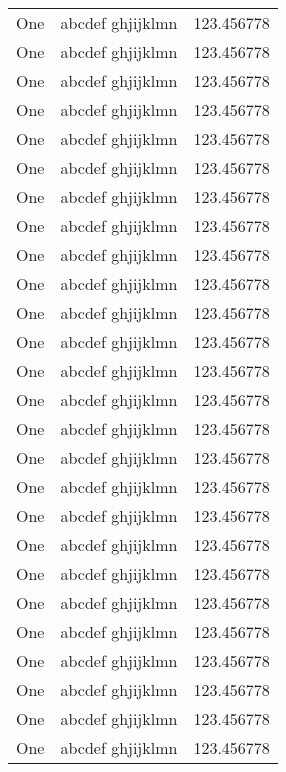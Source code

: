 \begin{longtable}{|p{3cm}|p{7cm}|p{5cm}|}
    One & abcdef ghjijklmn & 123.456778 \\
    One & abcdef ghjijklmn & 123.456778 \\
    One & abcdef ghjijklmn & 123.456778 \\
    One & abcdef ghjijklmn & 123.456778 \\
    One & abcdef ghjijklmn & 123.456778 \\
    One & abcdef ghjijklmn & 123.456778 \\
    One & abcdef ghjijklmn & 123.456778 \\
    One & abcdef ghjijklmn & 123.456778 \\
    One & abcdef ghjijklmn & 123.456778 \\
    One & abcdef ghjijklmn & 123.456778 \\
    One & abcdef ghjijklmn & 123.456778 \\
    One & abcdef ghjijklmn & 123.456778 \\
    One & abcdef ghjijklmn & 123.456778 \\
    One & abcdef ghjijklmn & 123.456778 \\
    One & abcdef ghjijklmn & 123.456778 \\
    One & abcdef ghjijklmn & 123.456778 \\
    One & abcdef ghjijklmn & 123.456778 \\
    One & abcdef ghjijklmn & 123.456778 \\
    One & abcdef ghjijklmn & 123.456778 \\
    One & abcdef ghjijklmn & 123.456778 \\
    One & abcdef ghjijklmn & 123.456778 \\
    One & abcdef ghjijklmn & 123.456778 \\
    One & abcdef ghjijklmn & 123.456778 \\
    One & abcdef ghjijklmn & 123.456778 \\
    One & abcdef ghjijklmn & 123.456778 \\
    One & abcdef ghjijklmn & 123.456778 \\
    \hline
\end{longtable}